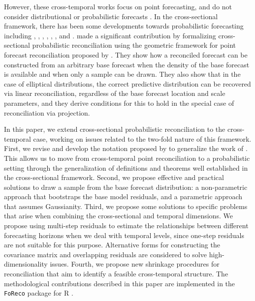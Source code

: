 \documentclass[a4paper,11pt]{article}
\theoremstyle{definition}
\begin{document}
However, these cross-temporal works focus on point forecasting, and do not consider distributional or probabilistic forecasts \citep{gneiting2014}. In the cross-sectional framework, there has been some developments towards probabilistic forecasting including  \cite{bentaieb2017}, \cite{panamtash2018}, \cite{jeon2019}, \cite{bentaieb2021}, \cite{corani2021}, \cite{corani2022}, and \cite{zambon2022}. \cite{panagiotelis2023} made a significant contribution by formalizing cross-sectional probabilistic reconciliation using the geometric framework for point forecast reconciliation proposed by \cite{panagiotelis2021}. They show how a reconciled forecast can be constructed from an arbitrary base forecast when the density of the base forecast is available and when only a sample can be drawn. They also show that in the case of elliptical distributions, the correct predictive distribution can be recovered via linear reconciliation, regardless of the base forecast location and scale parameters, and they derive conditions for this to hold in the special case of reconciliation via projection.

In this paper, we extend cross-sectional probabilistic reconciliation to the cross-temporal case, working on issues related to the two-fold nature of this framework. First, we revise and develop the notation proposed by \cite{difonzo2023} to generalize the work of \cite{panagiotelis2023}. This allows us to move from cross-temporal point reconciliation to a probabilistic setting through the generalization of definitions and theorems well established in the cross-sectional framework. Second, we propose effective and practical solutions to draw a sample from the base forecast distribution: a non-parametric approach that bootstraps the base model residuals, and a parametric approach that assumes Gaussianity. Third, we propose some solutions to specific problems that arise when combining the cross-sectional and temporal dimensions. We propose using multi-step residuals to estimate the relationships between different forecasting horizons when we deal with temporal levels, since one-step residuals are not suitable for this purpose. Alternative forms for constructing the covariance matrix and overlapping residuals are considered to solve high-dimensionality issues. Fourth, we propose new shrinkage procedures for reconciliation that aim to identify a feasible cross-temporal structure. The methodological contributions described in this paper are implemented in the \texttt{FoReco} package for R \citep{foreco2023}.
\end{document}
